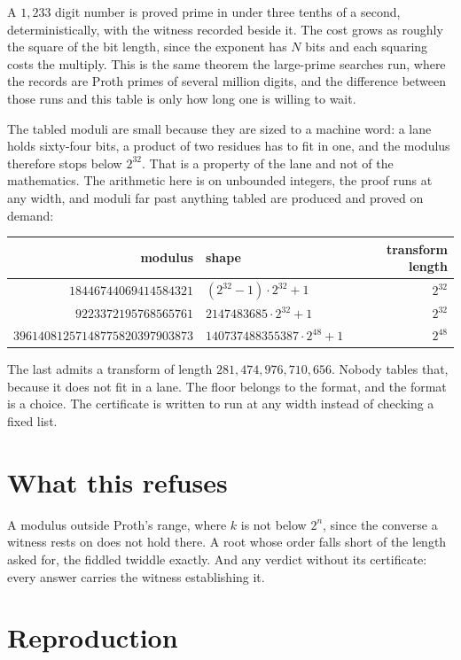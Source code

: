 \documentclass{article}
\begin{document}
A \(1{,}233\) digit number is proved prime in under three tenths of a second, deterministically, with the witness recorded beside it. The cost grows as roughly the square of the bit length, since the exponent has \(N\) bits and each squaring costs the multiply. This is the same theorem the large-prime searches run, where the records are Proth primes of several million digits, and the difference between those runs and this table is only how long one is willing to wait.

The tabled moduli are small because they are sized to a machine word: a lane holds sixty-four bits, a product of two residues has to fit in one, and the modulus therefore stops below \(2^{32}\). That is a property of the lane and not of the mathematics. The arithmetic here is on unbounded integers, the proof runs at any width, and moduli far past anything tabled are produced and proved on demand:

\begin{center}
\begin{tabular}{@{}rlr@{}}
\toprule
modulus & shape & transform length \\
\midrule
\(18446744069414584321\) & \((2^{32}-1) \cdot 2^{32} + 1\) & \(2^{32}\) \\
\(9223372195768565761\) & \(2147483685 \cdot 2^{32} + 1\) & \(2^{32}\) \\
\(39614081257148775820397903873\) & \(140737488355387 \cdot 2^{48} + 1\) & \(2^{48}\) \\
\bottomrule
\end{tabular}
\end{center}

The last admits a transform of length \(281{,}474{,}976{,}710{,}656\). Nobody tables that, because it does not fit in a lane. The floor belongs to the format, and the format is a choice. The certificate is written to run at any width instead of checking a fixed list.

\section{What this refuses}

A modulus outside Proth's range, where \(k\) is not below \(2^n\), since the converse a witness rests on does not hold there. A root whose order falls short of the length asked for, the fiddled twiddle exactly. And any verdict without its certificate: every answer carries the witness establishing it.

\section{Reproduction}
\end{document}
